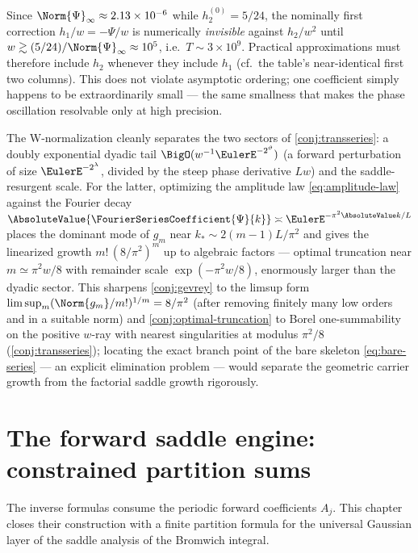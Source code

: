 \documentclass[11pt,oneside]{article}
\numberwithin{equation}{section}
\theoremstyle{definition}
\theoremstyle{remark}
\begin{document}
\begin{remark}
Since $\Norm{\Psi}_\infty\approx2.13\times10^{-6}$ while
$h_2^{(0)}=5/24$, the nominally first correction $h_1/w=-\Psi/w$ is
numerically \emph{invisible} against $h_2/w^{2}$ until
$w\gtrsim(5/24)/\Norm{\Psi}_\infty\approx10^{5}$, i.e.\
$T\sim3\times10^{9}$.  Practical approximations must therefore
include $h_2$ whenever they include $h_1$
(cf.\ the table's near-identical first two columns).  This does not
violate asymptotic ordering; one coefficient simply happens to be
extraordinarily small --- the same smallness that makes the phase
oscillation resolvable only at high precision.
\end{remark}

\begin{remark}
The W-normalization cleanly separates the two sectors of
\cref{conj:transseries}: a doubly exponential dyadic tail
$\BigO(w^{-1}\EulerE^{-2^{\vartheta}})$ (a forward perturbation of size
$\EulerE^{-2^{\lambda}}$, divided by the steep phase derivative $Lw$) and
the saddle-resurgent scale.  For the latter, optimizing the
amplitude law \eqref{eq:amplitude-law} against the Fourier decay
$\AbsoluteValue{\FourierSeriesCoefficient{\Psi}{k}}\asymp\EulerE^{-\pi^{2}\AbsoluteValue k/L}$ places the dominant
mode of $g_m$ near $k_*\sim2(m-1)L/\pi^{2}$ and gives the linearized
growth $m!\,(8/\pi^{2})^{m}$ up to algebraic factors --- optimal
truncation near $m\simeq\pi^{2}w/8$ with remainder scale
$\exp(-\pi^{2}w/8)$, enormously larger than the dyadic sector.  This
sharpens \cref{conj:gevrey} to the limsup form
$\limsup_m(\Norm{g_m}/m!)^{1/m}=8/\pi^{2}$ (after removing finitely
many low orders and in a suitable norm) and
\cref{conj:optimal-truncation} to Borel one-summability on the
positive $w$-ray with nearest singularities at modulus
$\pi^{2}/8$ (\cref{conj:transseries}); locating the exact branch
point of the bare skeleton \eqref{eq:bare-series} --- an explicit
elimination problem --- would separate the geometric carrier growth
from the factorial saddle growth rigorously.
\end{remark}

\section{The forward saddle engine: constrained partition sums}
\label{sec:saddle}

The inverse formulas consume the periodic forward coefficients
$A_j$.  This chapter closes their construction with a finite
partition formula for the universal Gaussian layer of the saddle
analysis of the Bromwich integral.
\end{document}
